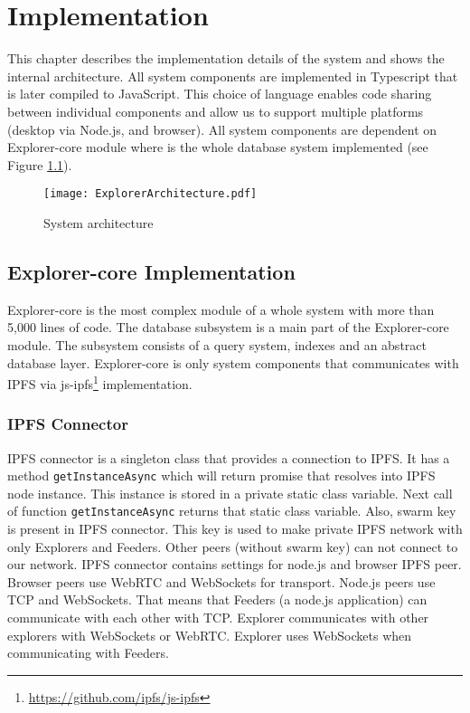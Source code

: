 \chapter{Implementation}
\label{Implementation}
This chapter describes the implementation details of the system and shows the internal architecture. All system components are implemented in Typescript that is later compiled to JavaScript. This choice of language enables code sharing between individual components and allow us to support multiple platforms (desktop via Node.js, and browser). All system components are dependent on Explorer-core module where is the whole database system implemented (see Figure \ref{systemArchitecture}). 


\begin{figure}[h]
    \centering
    \texttt{[image: ExplorerArchitecture.pdf]}
    \caption{System architecture}
    \label{systemArchitecture}
\end{figure}


\section{Explorer-core Implementation}
Explorer-core is the most complex module of a whole system with more than 5,000 lines of code. The database subsystem is a main part of the Explorer-core module. The subsystem consists of a query system, indexes and an abstract database layer. Explorer-core is only system components that communicates with IPFS via js-ipfs\footnote{\url{https://github.com/ipfs/js-ipfs}} implementation.

\subsection{IPFS Connector}
IPFS connector is a singleton class that provides a connection to IPFS. It has a method \texttt{getInstanceAsync} which will return promise that resolves into IPFS node instance. This instance is stored in a private static class variable. Next call of function \texttt{getInstanceAsync} returns that static class variable.
Also, swarm key is present in IPFS connector. This key is used to make private IPFS network with only Explorers and Feeders. Other peers (without swarm key) can not connect to our network. IPFS connector contains settings for node.js and browser IPFS peer. Browser peers use WebRTC and WebSockets for transport. Node.js peers use TCP and WebSockets. That means that Feeders (a node.js application) can communicate with each other with TCP. Explorer communicates with other explorers with WebSockets or WebRTC. Explorer uses WebSockets when communicating with Feeders.

